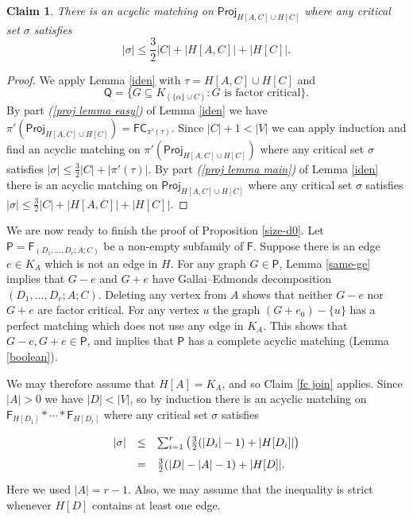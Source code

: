 \documentclass[10pt]{amsart}
\newtheorem{claim}[thm]{Claim}
\theoremstyle{definition}
\begin{document}
	\begin{claim}\label{projection 2 AC}
		There is an acyclic matching on $\mathsf{Proj}_{H[A,C]\cup H[C]}$ where any critical set $\sigma$ satisfies 
		\[|\sigma| \leq \textstyle{\frac{3}{2}}|C| + |H[A,C]| + |H[C]|.\]
	\end{claim}
	
	\begin{proof}
		We apply Lemma \ref{iden} with $\tau = H[A,C]\cup H[C]$ and 
		\[\mathsf{Q} = \{G\subseteq K_{(\{\alpha\}\cup C)} : G \text{ is factor critical}\}.\]
		By part {\em (\ref{proj lemma easy})} of Lemma \ref{iden} we have
		$\pi'(\mathsf{Proj}_{H[A,C]\cup H[C]}) = \mathsf{FC}_{\pi'(\tau)}$. Since $|C|+1 <|V|$ we can apply induction and find an acyclic matching on $\pi'(\mathsf{Proj}_{H[A,C]\cup H[C]})$ where any critical set $\sigma$ satisfies 
		$|\sigma| \leq \textstyle{\frac{3}{2}}|C| + |\pi'(\tau)|$.
		By part {\em (\ref{proj lemma main})} of Lemma \ref{iden} there is an acyclic matching on $\mathsf{Proj}_{H[A,C]\cup H[C]}$ where any critical set $\sigma$ satisfies $|\sigma|\leq \frac{3}{2}|C| + |H[A,C]| + |H[C]|$.
	\end{proof}
	
	We are now ready to finish the proof of Proposition \ref{size-d0}. Let $\mathsf{P} = \mathsf{F}_{(D_1,\dots, D_r; A; C)}$ be a non-empty subfamily of $\mathsf{F}$. Suppose there is an edge $e\in K_A$ which is not an edge in $H$. For any graph $G\in \mathsf{P}$, Lemma \ref{same-ge} implies that $G-e$ and $G+e$ have Gallai--Edmonds decomposition $(D_1, \dots, D_r; A; C)$. Deleting any vertex from $A$ shows that neither $G-e$ nor $G+e$ are factor critical. For any vertex $u$ the graph $(G+e_0)- \{u\}$ has a perfect matching which does not use any edge in $K_A$. This shows that $G-e, G+e \in \mathsf{P}$, and implies that $\mathsf{P}$ has a complete acyclic matching (Lemma \ref{boolean}). 
	
	We may therefore assume that $H[A] =K_A$, and so Claim \ref{fc join} applies. Since $|A|>0$ we have $|D|<|V|$, so by induction there is an acyclic matching on $\mathsf{F}_{H[D_1]}*\cdots *\mathsf{F}_{H[D_r]}$ where any critical set $\sigma$ satisfies
	\[\def\arraystretch{1.65}
	\begin{array}{rcl}
	|\sigma| & \leq & \textstyle{\sum}_{i=1}^r 
	\left( \textstyle{\frac{3}{2}}(|D_i|-1) + |H[D_i]| \right) \\
	& = & \textstyle{\frac{3}{2}}(|D|-|A|-1) + |H[D]|.
	\end{array}\]
	Here we used $|A| = r-1$. Also, we may assume that the inequality is strict whenever $H[D]$ contains at least one edge. 
	
\end{document}
